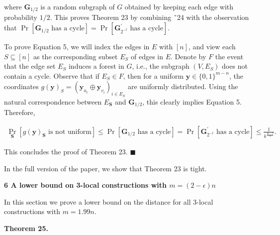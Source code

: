 where $\boldsymbol{G}_{1/2}$ is a random subgraph of $G$ obtained by keeping each edge with probability $1/2$.
This proves Theorem 23 by combining ˜24 with the observation that $\Pr[\text{$\boldsymbol{G}_{1/2}$ has a cycle}]=\Pr[\text{$\boldsymbol{G}^{\prime}_{2^{-t}}$ has a cycle}]$.\par




To prove Equation 5, we will index the edges in $E$ with $[n]$, and view each $S\subseteq[n]$ as the corresponding subset $E_{S}$ of edges in $E$.
Denote by $F$ the event that the edge set $E_{S}$ induces a forest in $G$, i.e., the subgraph $(V,E_{S})$ does not contain a cycle.
Observe that if $E_{S}\in F$, then for a uniform $\boldsymbol{y}\in\{0,1\}^{m-n}$, the coordinates $g(\boldsymbol{y})_{S}=(\boldsymbol{y}_{u_{i}}\oplus\boldsymbol{y}_{v_{i}})_{i\in E_{S}}$ are uniformly distributed.
Using the natural correspondence between $E_{\boldsymbol{S}}$ and $\boldsymbol{G}_{1/2}$, this clearly implies Equation 5.
Therefore,\par


\[\begin{gathered}
\displaystyle\Pr_{\boldsymbol{S}}[\text{$g(\boldsymbol{y})_{\boldsymbol{S}}$ is not uniform}]\leq\Pr[\text{$\boldsymbol{G}_{1/2}$ has a cycle}]=\Pr[\text{$\boldsymbol{G}^{\prime}_{2^{-t}}$ has a cycle}]\leq\frac{1}{k^{\frac{2t-5}{3}}}.
\end{gathered}\]


This concludes the proof of Theorem 23. \ensuremath{\blacksquare}\par




In the full version of the paper, we show that Theorem 23 is tight.\par







\par\medskip\noindent\textbf{
6 A lower bound on 3-local constructions with $m=(2-\epsilon)n$
}\par




In this section we prove a lower bound on the distance for all 3-local constructions with $m=1.99n$.\par





\par\medskip\noindent\textbf{
\textbf{Theorem 25}\textbf{.}
}\par



